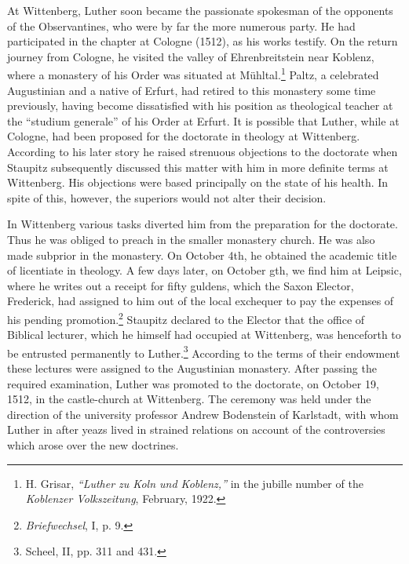 At Wittenberg, Luther soon became the passionate spokesman of
the opponents of the Observantines, who were by far the more
numerous party. He had participated in the chapter at Cologne
(1512), as his works testify. On the return journey from Cologne,
he visited the valley of Ehrenbreitstein near Koblenz, where a monastery
of his Order was situated at Mühltal.\footnote{
    H. Grisar, \textit{``Luther zu Koln und Koblenz,''} in the
    jubille number of the \textit{Koblenzer Volkszeitung}, February, 1922.}
Paltz, a celebrated
Augustinian and a native of Erfurt, had retired to this monastery
some time previously, having become dissatisfied with his position
as theological teacher at the “studium generale” of his Order at Erfurt.
It is possible that Luther, while at Cologne, had been proposed
for the doctorate in theology at Wittenberg. According to his later
story he raised strenuous objections to the doctorate when Staupitz
subsequently discussed this matter with him in more definite terms
at Wittenberg. His objections were based principally on the state
of his health. In spite of this, however, the superiors would not alter
their decision.

In Wittenberg various tasks diverted him from the preparation for
the doctorate. Thus he was obliged to preach in the smaller monastery
church. He was also made subprior in the monastery. On
October 4th, he obtained the academic title of licentiate in theology.
A few days later, on October gth, we find him at Leipsic, where
he writes out a receipt for fifty guldens, which the Saxon Elector,
Frederick, had assigned to him out of the local exchequer to pay
the expenses of his pending promotion.\footnote{\textit{Briefwechsel}, I, p. 9.}
Staupitz declared to the
Elector that the office of Biblical lecturer, which he himself had occupied
at Wittenberg, was henceforth to be entrusted permanently
to Luther.\footnote{Scheel, II, pp. 311 and 431.}
According to the terms of their endowment these lectures
were assigned to the Augustinian monastery. After passing the
required examination, Luther was promoted to the doctorate, on
October 19, 1512, in the castle-church at Wittenberg. The ceremony
was held under the direction of the university professor Andrew
Bodenstein of Karlstadt, with whom Luther in after yeazs lived in
strained relations on account of the controversies which arose over
the new doctrines.
